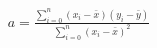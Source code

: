 \documentclass[10pt]{article}
\begin{document}
\begin{align*}a = \frac{{\sum\limits_{i=0}^n} (x_i - \bar{x})(y_i - \bar{y})}{ {\sum\limits_{i=0}^n} (x_i - \bar{x})^2}\end{align*}
\end{document}
